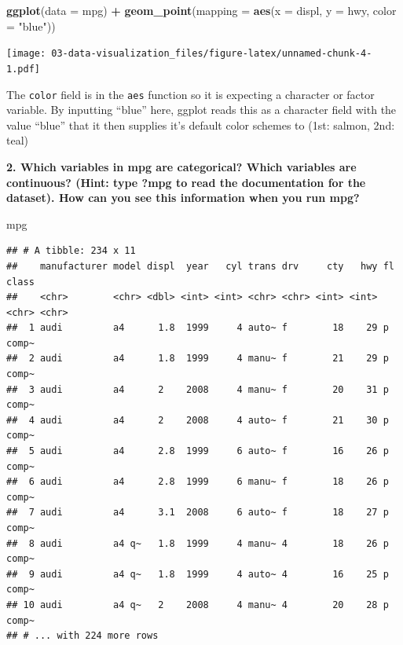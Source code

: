 \documentclass[]{book}
\newenvironment{Shaded}{\begin{snugshade}}{\end{snugshade}}
\newcommand{\DataTypeTok}[1]{\textcolor[rgb]{0.13,0.29,0.53}{#1}}
\newcommand{\KeywordTok}[1]{\textcolor[rgb]{0.13,0.29,0.53}{\textbf{#1}}}
\newcommand{\NormalTok}[1]{#1}
\newcommand{\OperatorTok}[1]{\textcolor[rgb]{0.81,0.36,0.00}{\textbf{#1}}}
\newcommand{\StringTok}[1]{\textcolor[rgb]{0.31,0.60,0.02}{#1}}
\theoremstyle{definition}
\theoremstyle{definition}
\theoremstyle{definition}
\theoremstyle{remark}
\begin{document}
\begin{Shaded}
\begin{Highlighting}[]
\KeywordTok{ggplot}\NormalTok{(}\DataTypeTok{data =}\NormalTok{ mpg) }\OperatorTok{+}\StringTok{ }
\StringTok{  }\KeywordTok{geom_point}\NormalTok{(}\DataTypeTok{mapping =} \KeywordTok{aes}\NormalTok{(}\DataTypeTok{x =}\NormalTok{ displ, }\DataTypeTok{y =}\NormalTok{ hwy, }\DataTypeTok{color =} \StringTok{"blue"}\NormalTok{))}
\end{Highlighting}
\end{Shaded}

\texttt{[image: 03-data-visualization\_files/figure-latex/unnamed-chunk-4-1.pdf]}

The \texttt{color} field is in the \texttt{aes} function so it is
expecting a character or factor variable. By inputting ``blue'' here,
ggplot reads this as a character field with the value ``blue'' that it
then supplies it's default color schemes to (1st: salmon, 2nd: teal)

\textbf{2. Which variables in mpg are categorical? Which variables are
continuous? (Hint: type ?mpg to read the documentation for the dataset).
How can you see this information when you run mpg?}

\begin{Shaded}
\begin{Highlighting}[]
\NormalTok{mpg}
\end{Highlighting}
\end{Shaded}

\begin{verbatim}
## # A tibble: 234 x 11
##    manufacturer model displ  year   cyl trans drv     cty   hwy fl    class
##    <chr>        <chr> <dbl> <int> <int> <chr> <chr> <int> <int> <chr> <chr>
##  1 audi         a4      1.8  1999     4 auto~ f        18    29 p     comp~
##  2 audi         a4      1.8  1999     4 manu~ f        21    29 p     comp~
##  3 audi         a4      2    2008     4 manu~ f        20    31 p     comp~
##  4 audi         a4      2    2008     4 auto~ f        21    30 p     comp~
##  5 audi         a4      2.8  1999     6 auto~ f        16    26 p     comp~
##  6 audi         a4      2.8  1999     6 manu~ f        18    26 p     comp~
##  7 audi         a4      3.1  2008     6 auto~ f        18    27 p     comp~
##  8 audi         a4 q~   1.8  1999     4 manu~ 4        18    26 p     comp~
##  9 audi         a4 q~   1.8  1999     4 auto~ 4        16    25 p     comp~
## 10 audi         a4 q~   2    2008     4 manu~ 4        20    28 p     comp~
## # ... with 224 more rows
\end{verbatim}
\end{document}
